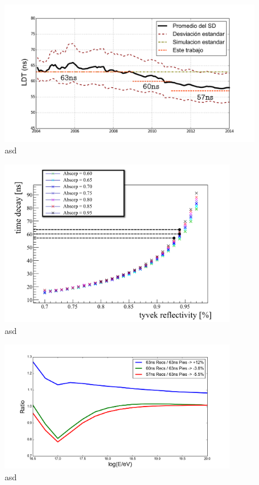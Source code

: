 	\begin{figure}[h!]
		\begin{center}
			\includegraphics[width=\textwidth]{fig/resultadosAuger/timeEvolution}
			\caption{asd}
			\label{fig:}
		\end{center}
	\end{figure}
	
	\begin{figure}[h!]
		\begin{center}
			\includegraphics[width=0.9\textwidth]{fig/resultadosAuger/timedecay_vs_reflect_absorp}
			\caption{asd}
			\label{fig:}
		\end{center}
	\end{figure}
	
	\begin{figure}[h!]
		\begin{center}
			\includegraphics[width=0.9\textwidth]{fig/resultadosAuger/exposure_Arrays}
			\caption{asd}
			\label{fig:}
		\end{center}
	\end{figure}
	
